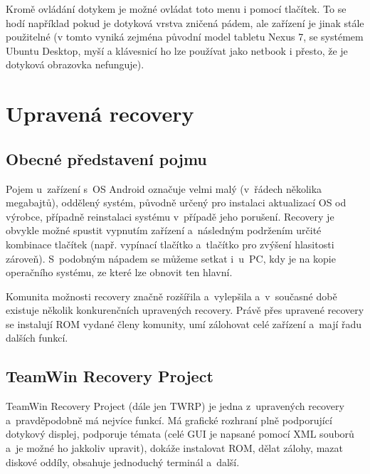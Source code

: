 \documentclass[12pt, a4paper, oneside]{article}
\begin{document}
Kromě ovládání dotykem je možné ovládat toto menu i pomocí tlačítek. To se hodí například pokud je dotyková vrstva zničená pádem, ale zařízení je jinak stále použitelné (v tomto vyniká zejména původní model tabletu Nexus 7, se systémem Ubuntu Desktop, myší a klávesnicí ho lze používat jako netbook i přesto, že je dotyková obrazovka nefunguje).

\newpage
\section{Upravená recovery}
\label{recovery}
\subsection{Obecné představení pojmu}
Pojem  u~zařízení s~OS Android označuje velmi malý (v~řádech několika megabajtů), oddělený systém, původně určený pro instalaci aktualizací OS od výrobce, případně reinstalaci systému v~případě jeho porušení. Recovery je obvykle možné spustit vypnutím zařízení a~následným podržením určité kombinace tlačítek (např. vypínací tlačítko a~tlačítko pro zvýšení hlasitosti zároveň). S~podobným nápadem se můžeme setkat i~u~PC, kdy je na  kopie operačního systému, ze které lze obnovit ten hlavní.

Komunita možnosti recovery značně rozšířila a~vylepšila a~v~současné době existuje několik konkurenčních upravených recovery. Právě přes upravené recovery se instalují ROM vydané členy komunity, umí zálohovat celé zařízení a~mají řadu dalších funkcí.

\subsection{TeamWin Recovery Project}
TeamWin Recovery Project\cite{twrp} (dále jen TWRP) je jedna z~upravených recovery a~pravděpodobně má nejvíce funkcí. Má grafické rozhraní plně podporující dotykový displej, podporuje témata (celé GUI je napsané pomocí XML souborů a~je možné ho jakkoliv upravit), dokáže instalovat ROM, dělat zálohy, mazat diskové oddíly, obsahuje jednoduchý terminál a~další.
\end{document}
